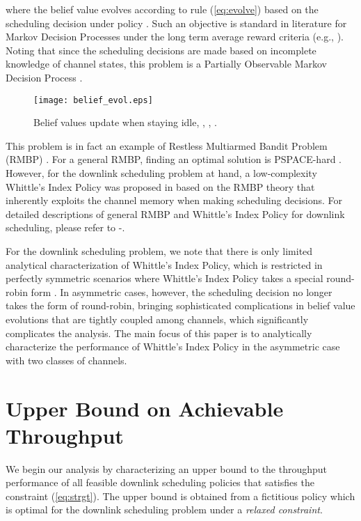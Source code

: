 \documentclass[11pt,twocolumn]{IEEEtran}
\begin{document}
where the belief value  evolves according to rule (\ref{eq:evolve}) based on the scheduling decision  under policy . Such an objective is standard in literature for Markov Decision Processes under the long term average reward criteria (e.g., \cite{Eitan}). Noting that since the scheduling decisions are made based on incomplete knowledge of channel states, this problem is a Partially Observable Markov Decision Process \cite{Sondik_thesis}.

\begin{figure}
\centering
\texttt{[image: belief\_evol.eps]}
\caption{Belief values update when staying idle, , , .}
\label{fig:Qupdate}
\end{figure}

This problem is in fact an example of Restless Multiarmed Bandit
Problem (RMBP) \cite{Whittle}. For a general RMBP, finding an
optimal solution is PSPACE-hard \cite{Tsitsiklis}. However, for the
downlink scheduling problem at hand, a low-complexity Whittle's Index Policy was proposed in \cite{Zhao_index}\cite{Infocom11} based on the RMBP
theory that inherently exploits the channel memory when making scheduling
decisions. For detailed descriptions of general RMBP
and Whittle's Index Policy for downlink scheduling, please refer to
\cite{Whittle}-\cite{Infocom11}.

For the downlink scheduling problem, we note that there is only limited analytical characterization of Whittle's Index Policy, which is restricted in perfectly symmetric scenarios where Whittle's Index Policy takes a special round-robin form \cite{Zhao_index}. In asymmetric cases, however, the scheduling decision no longer takes the form of round-robin, bringing sophisticated complications in belief value evolutions that are tightly coupled among channels, which significantly complicates the analysis. The main focus of this paper is to analytically characterize the performance of Whittle's Index Policy in the asymmetric case with two classes of channels.

\section{Upper Bound on Achievable Throughput}
\label{sec:bound}

We begin our analysis by characterizing an upper bound to the throughput performance of all feasible downlink scheduling policies that satisfies the constraint (\ref{eq:strgt}). The upper bound is obtained from a fictitious policy which is optimal for the downlink scheduling problem under a \emph{relaxed constraint}.
\end{document}
